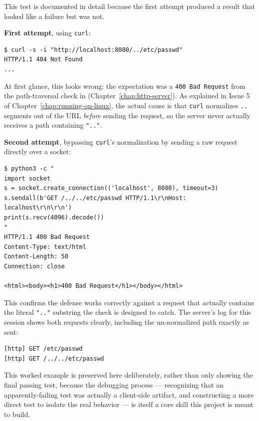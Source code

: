 This test is documented in detail because the first attempt produced a result that looked like a failure but was not.

\textbf{First attempt}, using \texttt{curl}:
\begin{lstlisting}[style=bashstyle, numbers=none]
$ curl -s -i "http://localhost:8080/../etc/passwd"
HTTP/1.1 404 Not Found
...
\end{lstlisting}

At first glance, this looks wrong: the expectation was a \texttt{400 Bad Request} from the path-traversal check in  (Chapter~\ref{chap:http-server}). As explained in Issue 5 of Chapter~\ref{chap:running-on-linux}, the actual cause is that \texttt{curl} normalizes \texttt{..} segments out of the URL \emph{before} sending the request, so the server never actually receives a path containing \texttt{".."}.

\textbf{Second attempt}, bypassing \texttt{curl}'s normalization by sending a raw request directly over a socket:
\begin{lstlisting}[style=bashstyle, numbers=none]
$ python3 -c "
import socket
s = socket.create_connection(('localhost', 8080), timeout=3)
s.sendall(b'GET /../../etc/passwd HTTP/1.1\r\nHost: localhost\r\n\r\n')
print(s.recv(4096).decode())
"
HTTP/1.1 400 Bad Request
Content-Type: text/html
Content-Length: 50
Connection: close

<html><body><h1>400 Bad Request</h1></body></html>
\end{lstlisting}

This confirms the defense works correctly against a request that actually contains the literal \texttt{".."} substring the check is designed to catch. The server's log for this session shows both requests clearly, including the un-normalized path exactly as sent:

\begin{lstlisting}[style=bashstyle, numbers=none]
[http] GET /etc/passwd
[http] GET /../../etc/passwd
\end{lstlisting}

\begin{note}
This worked example is preserved here deliberately, rather than only showing the final passing test, because the debugging process --- recognizing that an apparently-failing test was actually a client-side artifact, and constructing a more direct test to isolate the real behavior --- is itself a core skill this project is meant to build.
\end{note}

